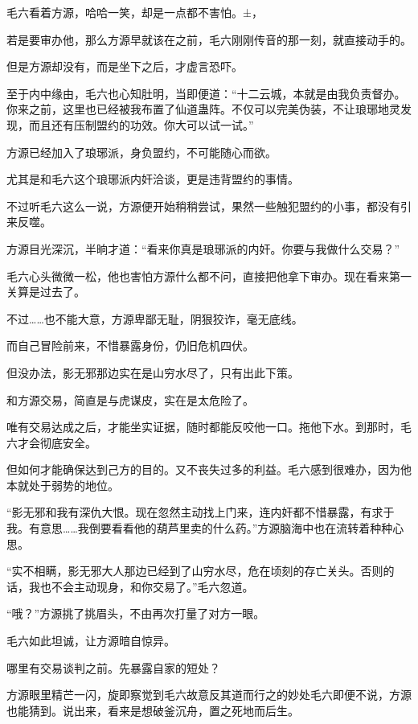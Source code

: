 
\begin{this_body}

毛六看着方源，哈哈一笑，却是一点都不害怕。±，

若是要审办他，那么方源早就该在之前，毛六刚刚传音的那一刻，就直接动手的。

但是方源却没有，而是坐下之后，才虚言恐吓。

至于内中缘由，毛六也心知肚明，当即便道：“十二云城，本就是由我负责督办。你来之前，这里也已经被我布置了仙道蛊阵。不仅可以完美伪装，不让琅琊地灵发现，而且还有压制盟约的功效。你大可以试一试。”

方源已经加入了琅琊派，身负盟约，不可能随心而欲。

尤其是和毛六这个琅琊派内奸洽谈，更是违背盟约的事情。

不过听毛六这么一说，方源便开始稍稍尝试，果然一些触犯盟约的小事，都没有引来反噬。

方源目光深沉，半晌才道：“看来你真是琅琊派的内奸。你要与我做什么交易？”

毛六心头微微一松，他也害怕方源什么都不问，直接把他拿下审办。现在看来第一关算是过去了。

不过……也不能大意，方源卑鄙无耻，阴狠狡诈，毫无底线。

而自己冒险前来，不惜暴露身份，仍旧危机四伏。

但没办法，影无邪那边实在是山穷水尽了，只有出此下策。

和方源交易，简直是与虎谋皮，实在是太危险了。

唯有交易达成之后，才能坐实证据，随时都能反咬他一口。拖他下水。到那时，毛六才会彻底安全。

但如何才能确保达到己方的目的。又不丧失过多的利益。毛六感到很难办，因为他本就处于弱势的地位。

“影无邪和我有深仇大恨。现在忽然主动找上门来，连内奸都不惜暴露，有求于我。有意思……我倒要看看他的葫芦里卖的什么药。”方源脑海中也在流转着种种心思。

“实不相瞒，影无邪大人那边已经到了山穷水尽，危在顷刻的存亡关头。否则的话，我也不会主动现身，和你交易了。”毛六忽道。

“哦？”方源挑了挑眉头，不由再次打量了对方一眼。

毛六如此坦诚，让方源暗自惊异。

哪里有交易谈判之前。先暴露自家的短处？

方源眼里精芒一闪，旋即察觉到毛六故意反其道而行之的妙处毛六即便不说，方源也能猜到。说出来，看来是想破釜沉舟，置之死地而后生。


\end{this_body}

